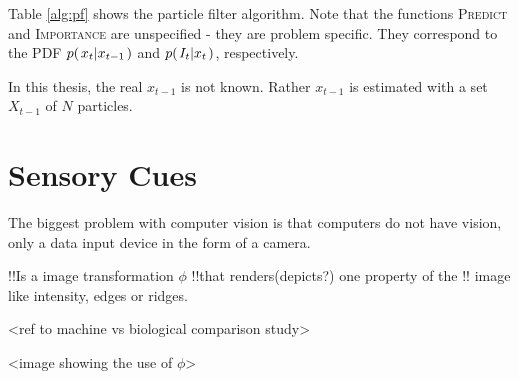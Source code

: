 Table \ref{alg:pf} shows the particle filter algorithm. Note that the functions \textsc{Predict} and \textsc{Importance} are unspecified
- they are problem specific. They correspond to the PDF $p{(\left. x_t \middle\vert x_{t-1} \right.)}$ and $p{(\left. I_t \middle\vert x_t \right.)}$, respectively.


In this thesis, the real $x_{t-1}$ is not known. Rather $x_{t-1}$ is estimated with a set $X_{t-1}$ of $N$ particles.

\section{Sensory Cues}

The biggest problem with computer vision is that computers do not have
vision, only a data input device in the form of a camera. 


!!Is a image transformation $\phi$ 
!!that renders(depicts?) one property of the
!!   image like intensity, edges or ridges.

<ref to machine vs biological comparison study>


<image showing the use of $\phi$>



